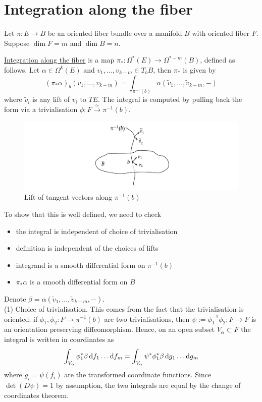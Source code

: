 \section{Integration along the fiber} \label{section:fiber_integration}
Let $\pi: E\to B$ be an oriented fiber bundle over a manifold $B$ with oriented
fiber $F$. Suppose $\dim F = m$ and $\dim B = n$.
\begin{defn}
	\underline{Integration along the fiber} is a map $\pi_* : \Omega^*(E)\to
	\Omega^{*-m}(B)$, defined as follows. Let $\alpha\in \Omega^k(E)$ and
	$v_1,\ldots,v_{k-m} \in T_bB$, then $\pi_*$ is given by 
	\[
	(\pi_*\alpha)_b(v_1,\ldots,v_{k-m}) = \int_{\pi^{-1}(b)}
	\alpha(\widetilde{v}_1,\ldots,\widetilde{v}_{k-m},-)
	\] 
	where $\widetilde{v}_i$ is any lift of $v_i$ to $TE$. 
The integral is computed by pulling back the form via a trivialisation $\phi 
:F \xrightarrow{\simeq} \pi^{-1}(b)$. 
\end{defn}
\begin{figure}[htb]
	\hfill
	\begin{minipage}[c]{0.5\textwidth}
	\includegraphics[trim={5cm 5mm 5cm 3mm},clip,width=\textwidth]{figs/fiber_integral.pdf}
	\end{minipage} 
	\begin{minipage}[c]{0.44\textwidth}
	\caption{Lift of tangent vectors along $\pi^{-1}(b)$}
	\label{fig:fiber_integral}
	\end{minipage} 
\end{figure}
To show that this is well defined, we need to check 
\begin{itemize}
	\item the integral is independent of choice of trivialisation
	\item definition is independent of the choices of lifts
	\item integrand is a smooth differential form on $\pi^{-1}(b)$
	\item $\pi_*\alpha$ is a smooth differential form on $B$
\end{itemize}
Denote $\beta = \alpha(\widetilde{v}_1,\ldots,\widetilde{v}_{k-m},-)$.\\
(1) Choice of trivialisation. This comes from the fact that the trivialisation
is oriented: if $\phi_1,\phi_2 : F \to \pi^{-1}(b)$ are two trivialisations,
then $\psi:=\phi_1^{-1}\phi_2 : F \to F$ is an orientation preserving diffeomorphism. 
Hence, on an open subset $V_\alpha \subset F$ the integral is written in
coordinates as  
\[
\int_{V_{\alpha}} \phi_1^*\beta \odif{f_1}\ldots\odif{f_m} 
= \int_{V_\alpha} \psi^*\phi_1^*\beta  \odif{g_1}\ldots\odif{g_m}
\] 
where $g_i = \psi(f_i)$ are the transformed coordinate functions. Since
$\det(D\psi)=1$ by assumption, the two integrals are equal by the change of 
coordinates theorem. 

